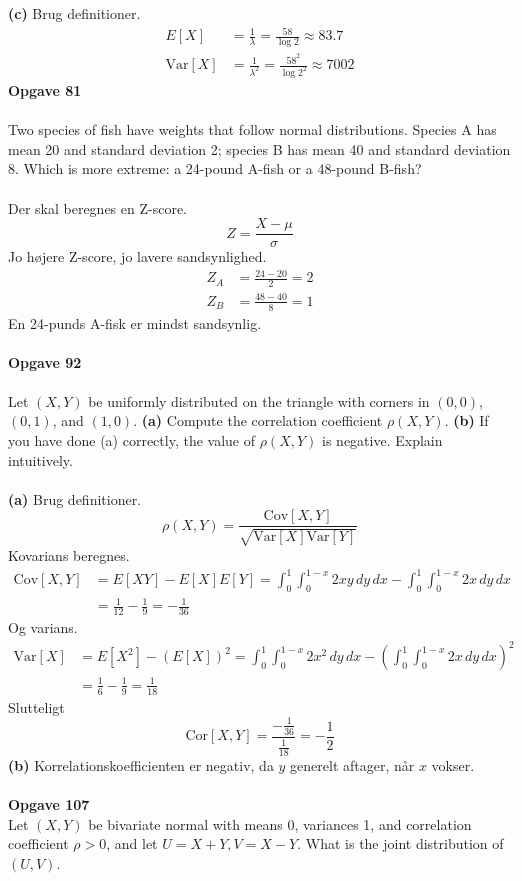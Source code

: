 \documentclass[12pt,a4paper,draft]{report}
\begin{document}
\textbf{(c)} Brug definitioner.
\begin{align*}
E[X]&=\frac{1}{\lambda}=\frac{58}{\log2}\approx83.7\\
\text{Var}[X]&=\frac{1}{\lambda^2}=\frac{58^2}{\log2^2}\approx7002
\end{align*}
\textbf{Opgave 81}\\\\
Two species of fish have weights that follow normal distributions. Species A has mean 20 and standard deviation 2; species B has mean 40 and standard deviation 8. Which is more extreme: a 24-pound A-fish or a 48-pound B-fish?\\\\
Der skal beregnes en Z-score.
\begin{equation}
Z=\frac{X-\mu}{\sigma}
\end{equation}
Jo højere Z-score, jo lavere sandsynlighed.
\begin{align*}
Z_A&=\frac{24-20}{2}=2\\
Z_B&=\frac{48-40}{8}=1
\end{align*}
En 24-punds A-fisk er mindst sandsynlig.\\\\
\textbf{Opgave 92}\\\\
Let $(X,Y)$ be uniformly distributed on the triangle with corners in $(0,0)$,$(0,1)$, and $(1,0)$. \textbf{(a)} Compute the correlation coefficient $\rho(X,Y)$. \textbf{(b)} If you have done (a) correctly, the value of $\rho(X,Y)$ is negative. Explain intuitively.\\\\
\textbf{(a)} Brug definitioner.
\begin{equation}
\rho(X,Y)=\frac{\text{Cov}[X,Y]}{\sqrt{\text{Var}[X]\text{Var}[Y]}}
\end{equation}
Kovarians beregnes.
\begin{align*}
\text{Cov}[X,Y]&=E[XY]-E[X]E[Y]=\int_0^1\!\int_0^{1-x}2xy\,dy\,dx-\int_0^1\!\int_0^{1-x}2x\,dy\,dx\\
&=\frac{1}{12}-\frac{1}{9}=-\frac{1}{36}
\end{align*}
Og varians.
\begin{align*}
\text{Var}[X]&=E[X^2]-(E[X])^2=\int_0^1\!\int_0^{1-x}2x^2\,dy\,dx-\left(\int_0^1\!\int_0^{1-x}\!2x\,dy\,dx\right)^2\\
&=\frac{1}{6}-\frac{1}{9}=\frac{1}{18}
\end{align*}
Slutteligt
\begin{equation}
\text{Cor}[X,Y]=\frac{-\frac{1}{36}}{\frac{1}{18}}=-\frac{1}{2}
\end{equation}
\textbf{(b)} Korrelationskoefficienten er negativ, da $y$ generelt aftager, når $x$ vokser.\\\\
\textbf{Opgave 107}\\
Let $(X,Y)$ be bivariate normal with means 0, variances 1, and correlation coefficient $\rho>0$, and let $U=X+Y,V=X-Y$. What is the joint distribution of $(U,V)$.
\end{document}
